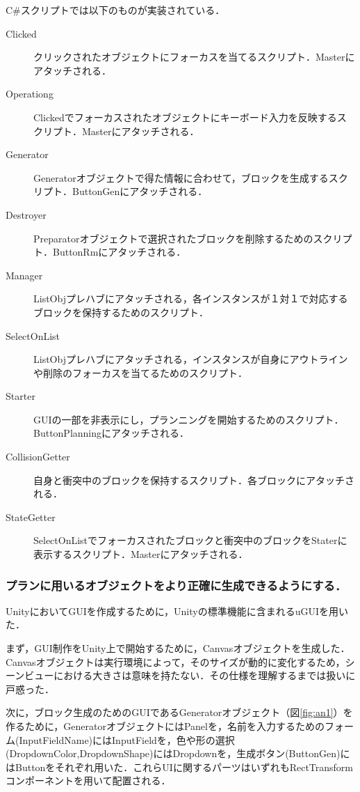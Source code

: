 \documentclass[12pt]{jarticle}
\begin{document}
C\#スクリプトでは以下のものが実装されている．
\begin{description}
\item[Clicked] クリックされたオブジェクトにフォーカスを当てるスクリプト．Masterにアタッチされる．
\item[Operationg] Clickedでフォーカスされたオブジェクトにキーボード入力を反映するスクリプト．Masterにアタッチされる．
\item[Generator] Generatorオブジェクトで得た情報に合わせて，ブロックを生成するスクリプト．ButtonGenにアタッチされる．
\item[Destroyer] Preparatorオブジェクトで選択されたブロックを削除するためのスクリプト．ButtonRmにアタッチされる．
\item[Manager] ListObjプレハブにアタッチされる，各インスタンスが１対１で対応するブロックを保持するためのスクリプト．
\item[SelectOnList] ListObjプレハブにアタッチされる，インスタンスが自身にアウトラインや削除のフォーカスを当てるためのスクリプト．
\item[Starter] GUIの一部を非表示にし，プランニングを開始するためのスクリプト．ButtonPlanningにアタッチされる．
\item[CollisionGetter] 自身と衝突中のブロックを保持するスクリプト．各ブロックにアタッチされる．
\item[StateGetter] SelectOnListでフォーカスされたブロックと衝突中のブロックをStaterに表示するスクリプト．Masterにアタッチされる．
\end{description}

\subsubsection{プランに用いるオブジェクトをより正確に生成できるようにする．}
Unity\cite{unity}においてGUIを作成するために，Unityの標準機能に含まれるuGUI\cite{ugui}を用いた．

まず，GUI制作をUnity上で開始するために，Canvasオブジェクトを生成した．Canvasオブジェクトは実行環境によって，そのサイズが動的に変化するため，シーンビューにおける大きさは意味を持たない．その仕様を理解するまでは扱いに戸惑った．

次に，ブロック生成のためのGUIであるGeneratorオブジェクト（図\ref{fig:an1}）を作るために，GeneratorオブジェクトにはPanelを，名前を入力するためのフォーム(InputFieldName)にはInputFieldを，色や形の選択(DropdownColor,DropdownShape)にはDropdownを，生成ボタン(ButtonGen)にはButtonをそれぞれ用いた．これらUIに関するパーツはいずれもRectTransformコンポーネントを用いて配置される．
\end{document}

